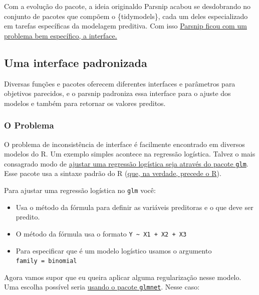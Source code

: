\documentclass[
]{article}
\providecommand{\tightlist}{%
  \setlength{\itemsep}{0pt}\setlength{\parskip}{0pt}}
\begin{document}
Com a evolução do pacote, a ideia originaldo Parsnip acabou se
desdobrando no conjunto de pacotes que compõem o \{tidymodels\}, cada um
deles especializado em tarefas específicas da modelagem preditiva. Com
isso
\href{https://www.tidyverse.org/blog/2018/11/parsnip-0-0-1/}{Parsnip
ficou com um problema bem específico, a interface.}

\hypertarget{uma-interface-padronizada}{%
\subsection{Uma interface padronizada}\label{uma-interface-padronizada}}

Diversas funções e pacotes oferecem diferentes interfaces e parâmetros
para objetivos parecidos, e o parsnip padroniza essa interface para o
ajuste dos modelos e também para retornar os valores preditos.

\hypertarget{o-problema}{%
\subsubsection{O Problema}\label{o-problema}}

O problema de inconsistência de interface é facilmente encontrado em
diversos modelos do R. Um exemplo simples acontece na regressão
logística. Talvez o mais consagrado modo de
\href{https://www.rdocumentation.org/packages/stats/versions/3.6.2/topics/glm}{ajustar
uma regressão logística seja através do pacote \texttt{glm}}. Esse
pacote usa a sintaxe padrão do R
(\href{https://www.amazon.com.br/dp/B07737S8XJ/ref=dp-kindle-redirect?_encoding=UTF8\&btkr=1}{que,
na verdade, precede o R}).

Para ajustar uma regressão logística no \texttt{glm} você:

\begin{itemize}
\tightlist
\item
  Usa o método da fórmula para definir as variáveis preditoras e o que
  deve ser predito.
\item
  O método da fórmula usa o formato
  \texttt{Y\ \textasciitilde{}\ X1\ +\ X2\ +\ X3}
\item
  Para especificar que é um modelo logístico usamos o argumento
  \texttt{family\ =\ binomial}
\end{itemize}

Agora vamos supor que eu queira aplicar alguma regularização nesse
modelo. Uma escolha possível seria
\href{https://cran.r-project.org/web/packages/glmnet/index.html}{usando
o pacote \texttt{glmnet}}. Nesse caso:
\end{document}
